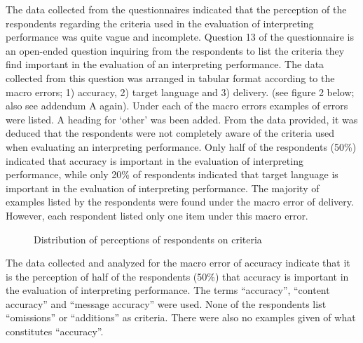 \documentclass[output=paper]{langsci/langscibook}
\begin{document}
The data collected from the questionnaires indicated that the perception of the respondents regarding the criteria used in the evaluation of interpreting performance was quite vague and incomplete. Question 13 of the questionnaire is an open-ended question inquiring from the respondents to list the criteria they find important in the evaluation of an interpreting performance.  The data collected from this question was arranged in tabular format according to the macro errors; 1) accuracy, 2) target language and 3) delivery. (see figure 2 below; also see addendum A again). Under each of the macro errors examples of errors were listed. A heading for ‘other’ was been added. From the data provided, it was deduced that the respondents were not completely aware of the criteria used when evaluating an interpreting performance.  Only half of the respondents (50\%) indicated that accuracy is important in the evaluation of interpreting performance, while only 20\% of respondents indicated that target language is important in the evaluation of interpreting performance. The majority of examples listed by the respondents were found under the macro error of delivery. However, each respondent listed only one item under this macro error. 

\begin{figure}
\caption{Distribution of perceptions of respondents on criteria}
\label{fig:deysel:2}
\end{figure}

The data collected and analyzed for the macro error of accuracy indicate that it is the perception of half of the respondents (50\%) that accuracy is important in the evaluation of interpreting performance. The terms “accuracy”, “content accuracy” and “message accuracy” were used. None of the respondents list “omissions” or “additions” as criteria. There were also no examples given of what constitutes “accuracy”.  
\end{document}
